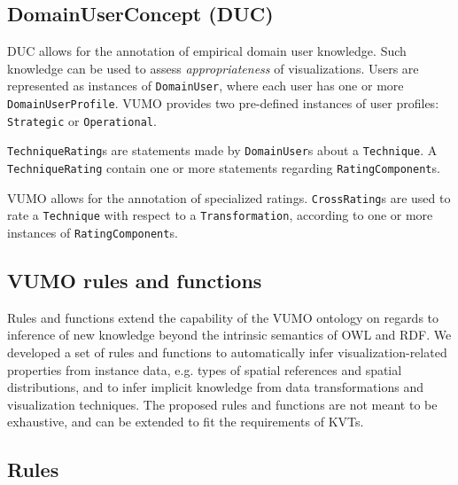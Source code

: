 \documentclass[]{interact}
\theoremstyle{plain}%
\theoremstyle{definition}
\theoremstyle{remark}
\theoremstyle{definition}
\begin{document}
\subsection{DomainUserConcept (DUC)}
\label{sec:duc}

DUC allows for the annotation of empirical domain user knowledge. Such knowledge can be used to assess \textit{appropriateness} of visualizations. Users are represented as instances of \texttt{DomainUser}, where each user has one or more \texttt{DomainUserProfile}. VUMO provides two pre-defined instances of user profiles: \texttt{Strategic} or \texttt{Operational}.


\texttt{TechniqueRating}s are statements made by \texttt{DomainUser}s about a \texttt{Technique}. A \texttt{Techni\-queRating} contain one or more statements regarding \texttt{Rating\-Component}s.

VUMO allows for the annotation of specialized ratings. \texttt{CrossRating}s are used to rate a \texttt{Technique} with respect to a \texttt{Transformation}, according to one or more instances of \texttt{Rating\-Component}s.



\subsection{VUMO rules and functions}
\label{sec:vumorules}

Rules and functions extend the capability of the VUMO ontology on regards to inference of new knowledge beyond the intrinsic semantics of OWL and RDF. We developed a set of rules and functions to automatically infer visualization-related properties from instance data, e.g. types of spatial references and spatial distributions, and to infer implicit knowledge from data transformations and visualization techniques. The proposed rules and functions are not meant to be exhaustive, and can be extended to fit the requirements of KVTs. %


\subsection{Rules}
\end{document}
